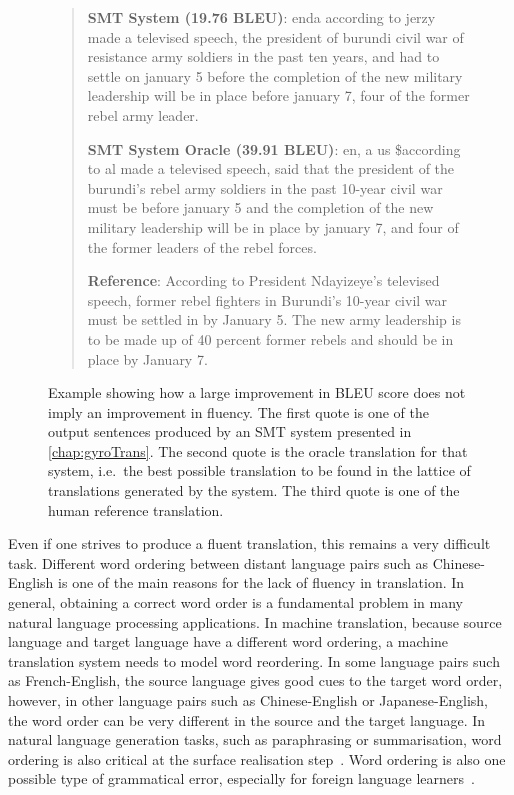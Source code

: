 \begin{figure}
\begin{quote}
  \textbf{SMT System (19.76 BLEU)}: enda according to jerzy made a televised speech, the president of burundi civil war of resistance army soldiers in the past ten years, and had to settle on january 5 before the completion of the new military leadership will be in place before january 7, four of the former rebel army leader.

  \textbf{SMT System Oracle (39.91 BLEU)}: en, a us \$according to al made a televised speech, said that the president of the burundi's rebel army soldiers in the past 10-year civil war must be before january 5 and the completion of the new military leadership will be in place by january 7, and four of the former leaders of the rebel forces.

  \textbf{Reference}: According to President Ndayizeye's televised speech, former rebel fighters in Burundi's 10-year civil war must be settled in by January 5.  The new army leadership is to be made up of 40 percent former rebels and should be in place by January 7.
\end{quote}
\caption{Example showing how a large improvement in BLEU score does not imply an improvement in fluency.
  The first quote is one of the output sentences produced by an SMT system presented in \autoref{chap:gyroTrans}.
  The second quote is the oracle translation for that system, i.e.\ the best possible translation to be found
  in the lattice of translations generated by the system. The third quote is one of the human reference translation.}
\label{fig:gamingBLEUexample}
\end{figure}

Even if one strives to produce a fluent translation, this remains a very difficult task.
Different word ordering between distant language pairs such as
Chinese-English is one of the main reasons for the lack of fluency in translation.
In general, obtaining a correct word order is a fundamental problem in many natural language
processing applications.
In machine translation, because
source language and target language have a different word
ordering, a machine translation system needs to model word
reordering. In some language pairs such as French-English, the
source language gives good cues to the target word order, however,
in other language pairs such as Chinese-English or Japanese-English,
the word order can be very different in the source and
the target language. In natural language generation tasks, such
as paraphrasing or summarisation, word ordering
is also critical at the surface realisation
step~\citep{reiter-dale:1997:JNLE}.
Word ordering is also one possible type of grammatical
error, especially for foreign language
learners~\citep{yu-chen:2012:COLING}. %

